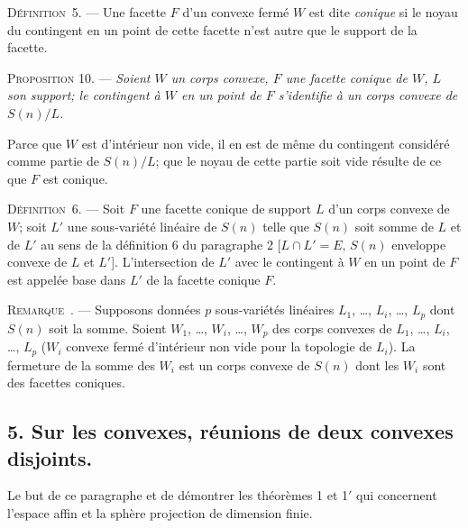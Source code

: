 \documentclass[11pt]{article}
\newcommand{\bzcf}[2]{#1}
\newcommand{\bznum}[1]{\if\relax\detokenize{#1}\relax\else\ #1\fi}
\newenvironment{defin}[1][]{\par\medskip\noindent\textsc{Définition\bznum{#1}.} --- }{\par\medskip}
\newenvironment{prop}[1][]{\par\medskip\noindent\textsc{Proposition #1.} --- \itshape}{\par\medskip}
\newenvironment{remarque}[1][]{\par\medskip\noindent\textsc{Remarque\bznum{#1}.} --- }{\par\medskip}
\newenvironment{proof}[1][]{\par}{\par}
\begin{document}
\begin{defin}[5]
Une facette $F$ d'un convexe fermé $W$ est dite \textit{conique} si le noyau du contingent en un
point de cette facette n'est autre que le support de la facette.
\end{defin}

\begin{prop}[10]
Soient $W$ un corps convexe, $F$ une facette conique de $W$, $L$ son support; le contingent à $W$
en un point de $F$ s'identifie à un corps convexe de $S(n)/L$.
\end{prop}

\begin{proof}
Parce que $W$ est d'intérieur non vide, il en est de même du contingent considéré comme partie de
$S(n)/L$; que le noyau de cette partie soit vide résulte de ce que $F$ est conique.
\end{proof}

\begin{defin}[6]
Soit $F$ une facette conique de support $L$ d'un corps convexe de $W$; soit $L'$ une sous-variété
linéaire de $S(n)$ telle que $S(n)$ soit somme de $L$ et de $L'$ au sens de \bzcf{la définition 6
du paragraphe 2}{\ref{bzdef:c3s2d6_distingue_projectif}} [$L\cap L'=E$, $S(n)$ enveloppe convexe
de $L$ et $L'$]. L'intersection de $L'$ avec le contingent à $W$ en un point de $F$ est appelée
base dans $L'$ de la facette conique $F$.
\end{defin}

\begin{remarque}
Supposons données $p$ sous-variétés linéaires $L_1$, \ldots, $L_i$, \ldots, $L_p$ dont $S(n)$
soit la somme. Soient $W_1$, \ldots, $W_i$, \ldots, $W_p$ des corps convexes de $L_1$, \ldots,
$L_i$, \ldots, $L_p$ ($W_i$ convexe fermé d'intérieur non vide pour la topologie de $L_i$). La
fermeture de la somme des $W_i$ est un corps convexe de $S(n)$ dont les $W_i$ sont des facettes
coniques.
\end{remarque}

\subsection*{5. Sur les convexes, réunions de deux convexes disjoints.}

Le but de ce paragraphe et de démontrer les \bzcf{théorèmes
1}{\ref{bzthm:c3s5t1_reunion_convexes_affine}} et
\bzcf{1$'$}{\ref{bzthm:c3s5t1prime_reunion_convexes_sphere}} qui concernent l'espace affin et la
sphère projection de dimension finie.
\end{document}
